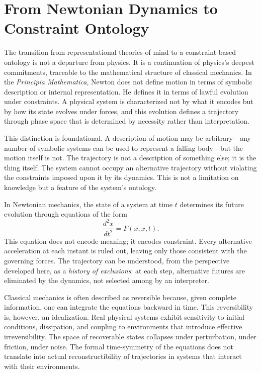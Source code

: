\documentclass[11pt]{article}
\theoremstyle{definition}
\theoremstyle{remark}
\begin{document}
\section{From Newtonian Dynamics to Constraint Ontology}

The transition from representational theories of mind to a constraint-based ontology is not
a departure from physics. It is a continuation of physics's deepest commitments, traceable
to the mathematical structure of classical mechanics. In the \textit{Principia Mathematica},
Newton does not define motion in terms of symbolic description or internal representation.
He defines it in terms of lawful evolution under constraints. A physical system is
characterized not by what it encodes but by how its state evolves under forces, and this
evolution defines a trajectory through phase space that is determined by necessity rather
than interpretation.

This distinction is foundational. A description of motion may be arbitrary---any number of
symbolic systems can be used to represent a falling body---but the motion itself is not.
The trajectory is not a description of something else; it is the thing itself. The system
cannot occupy an alternative trajectory without violating the constraints imposed upon it
by its dynamics. This is not a limitation on knowledge but a feature of the system's
ontology.

In Newtonian mechanics, the state of a system at time $t$ determines its future evolution
through equations of the form
\[
\frac{d^2 x}{dt^2} = F(x, \dot{x}, t).
\]
This equation does not encode meaning; it encodes constraint. Every alternative acceleration
at each instant is ruled out, leaving only those consistent with the governing forces. The
trajectory can be understood, from the perspective developed here, as a \emph{history of
exclusions}: at each step, alternative futures are eliminated by the dynamics, not selected
among by an interpreter.

Classical mechanics is often described as reversible because, given complete information,
one can integrate the equations backward in time. This reversibility is, however, an
idealization. Real physical systems exhibit sensitivity to initial conditions, dissipation,
and coupling to environments that introduce effective irreversibility. The space of
recoverable states collapses under perturbation, under friction, under noise. The formal
time-symmetry of the equations does not translate into actual reconstructibility of
trajectories in systems that interact with their environments.
\end{document}
